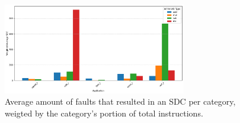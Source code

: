 \documentclass[lettersize,journal]{IEEEtran}
\begin{document}
\begin{figure}[!t] 
    \centering
    \includegraphics[width=8cm]{plots/average_arithmetic/benchmarks_grouped_by_category_weighted.pdf}
\caption{Average amount of faults that resulted in an SDC per category, weigted by the category's portion of total instructions.}
\label{average_weight}
\end{figure}







\end{document}
